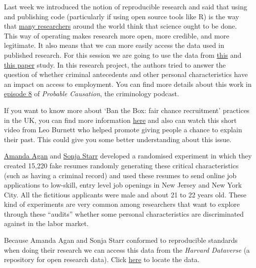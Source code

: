 \documentclass[
]{book}
\begin{document}
Last week we introduced the notion of reproducible research and said that using and publishing code (particularly if using open source tools like R) is the way that \href{https://osf.io/?gclid=EAIaIQobChMIq-jM6MuY2QIV7Z3tCh04vAycEAAYASAAEgLptPD_BwE}{many researchers} around the world think that science ought to be done. This way of operating makes research more open, more credible, and more legitimate. It also means that we can more easily access the data used in published research. For this session we are going to use the data from \href{https://academic.oup.com/qje/article/133/1/191/4060073}{this} and \href{https://pubs.aeaweb.org/doi/pdfplus/10.1257/aer.p20171003}{this paper} study. In this research project, the authors tried to answer the question of whether criminal antecedents and other personal characteristics have an impact on access to employment. You can find more details about this work in \href{https://www.probablecausation.com/podcasts/episode-8-amanda-agan}{episode 8} of \emph{Probable Causation}, the criminology podcast.

If you want to know more about `Ban the Box: fair chance recruitment' practices in the UK, you can find more information \href{https://recruit.unlock.org.uk/fair-chance-recruitment/ban-the-box/}{here} and also can watch this short video from Leo Burnett who helped promote giving people a chance to explain their past. This could give you some better understanding about this issue.

\href{http://economics.rutgers.edu/people/626-amanda-agan}{Amanda Agan} and \href{https://www.law.umich.edu/FacultyBio/Pages/FacultyBio.aspx?FacID=sbstarr}{Sonja Starr} developed a randomised experiment in which they created 15,220 fake resumes randomly generating these critical characteristics (such as having a criminal record) and used these resumes to send online job applications to low-skill, entry level job openings in New Jersey and New York City. All the fictitious applicants were male and about 21 to 22 years old. These kind of experiments are very common among researchers that want to explore through these ``audits'' whether some personal characteristics are discriminated against in the labor market.

Because Amanda Agan and Sonja Starr conformed to reproducible standards when doing their research we can access this data from the \emph{Harvard Dataverse} (a repository for open research data). Click \href{https://dataverse.harvard.edu/dataset.xhtml?persistentId=doi:10.7910/DVN/VPHMNT}{here} to locate the data.
\end{document}
